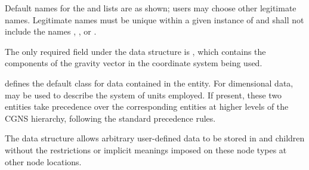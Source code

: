 \begin{notes}
\item
Default names for the  and 
lists are as shown; users may choose other legitimate names.
Legitimate names must be unique within a given instance of
 and shall not include the names ,
, or .
\end{notes}

The only required field under the  data structure is
, which contains the components of the gravity
vector in the coordinate system being used.

 defines the default class for data contained in the
 entity.
For dimensional data,  may be used to describe
the system of units employed.
If present, these two entities take precedence over the corresponding
entities at higher levels of the CGNS hierarchy, following the standard
precedence rules.

The  data structure allows arbitrary
user-defined data to be stored in  and
 children without the restrictions or implicit
meanings imposed on these node types at other node locations.
